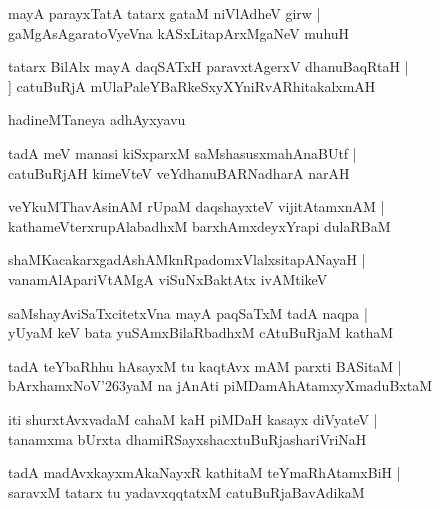 \documentclass[twoside,12pt,openright]{book}
\def\S{\char'263}
\newcounter{shloka}[chapter]
\begin{document}
\begin{shloka}%
mayA parayxTatA tatarx gataM niVlAdheV girw |\\
gaMgAsAgaratoVyeVna kASxLitapArxMgaNeV muhuH
\end{shloka}

\begin{shloka}%
tatarx BilAlx mayA daqSATxH paravxtAgerxV dhanuBaqRtaH |\\]
catuBuRjA mUlaPaleYBaRkeSxyXYniRvARhitakalxmAH 
\end{shloka}

\begin{center}
hadineMTaneya adhAyxyavu
\end{center}

\begin{shloka}%
tadA meV manasi kiSxparxM saMshasusxmahAnaBUtf |\\
catuBuRjAH kimeVteV veYdhanuBARNadharA narAH 
\end{shloka}

\begin{shloka}%
veYkuMThavAsinAM rUpaM daqshayxteV vijitAtamxnAM |\\
kathameVterxrupAlabadhxM barxhAmxdeyxYrapi dulaRBaM 
\end{shloka}

\begin{shloka}%
shaMKacakarxgadAshAMknRpadomxVlalxsitapANayaH |\\
vanamAlApariVtAMgA viSuNxBaktAtx ivAMtikeV 
\end{shloka}

\begin{shloka}%
saMshayAviSaTxcitetxVna mayA paqSaTxM tadA naqpa |\\
yUyaM keV bata yuSAmxBilaRbadhxM cAtuBuRjaM kathaM 
\end{shloka}

\begin{shloka}%
tadA teYbaRhhu hAsayxM tu kaqtAvx mAM parxti BASitaM |\\
bArxhamxNoV\S yaM na jAnAti piMDamAhAtamxyXmaduBxtaM 
\end{shloka}

\begin{shloka}%
iti shurxtAvxvadaM cahaM kaH piMDaH kasayx diVyateV |\\
tanamxma bUrxta dhamiRSayxshacxtuBuRjashariVriNaH
\end{shloka}

\begin{shloka}%
tadA madAvxkayxmAkaNayxR kathitaM teYmaRhAtamxBiH |\\
saravxM tatarx tu yadavxqqtatxM  catuBuRjaBavAdikaM 
\end{shloka}
\end{document}
